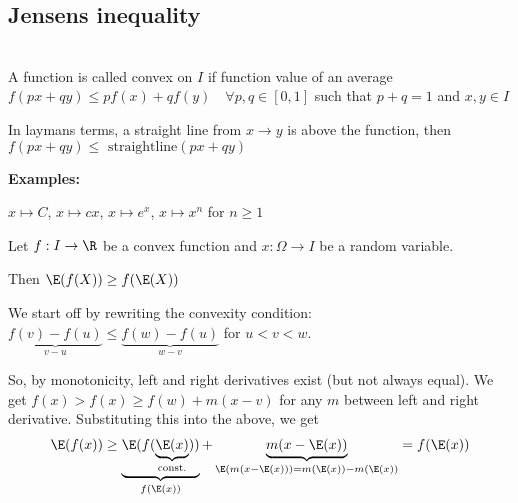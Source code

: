 \subsection{Jensens inequality}\hfill\\
\noindent A function is called convex on $I$ if function value of an average $f(px+qy)\leq pf(x)+qf(y)\quad\forall p,q\in[0,1]$ such that $p+q = 1$ and $x,y\in I$\par
\noindent In laymans terms, a straight line from $x\to y$ is above the function, then $f(px+qy)\leq\text{ straightline}(px+qy)$
\par\bigskip
\noindent\textbf{Examples:}\par
$x\mapsto C$, $x\mapsto cx$, $x\mapsto e^x$, $x\mapsto x^n$ for $n\geq 1$
\par\bigskip
\begin{defo}{}
  Let $f:I\to\R$ be a convex function and $x:\Omega\to I$ be a random variable.\par
  \noindent Then $\E(f(X))\geq f(\E(X))$
\end{defo}
\newpage
\begin{prf}{}
  We start off by rewriting the convexity condition: $\underbrace{f(v)-f(u)}_{v-u}\leq \underbrace{f(w)-f(u)}_{w-v}$ for $u<v<w$.\par
  \noindent So, by monotonicity, left and right derivatives exist (but not always equal). We get $f(x)>f(x)\geq f(w)+m(x-v)$ for any $m$ between left and right derivative. Substituting this into the above, we get
  \begin{equation*}
    \begin{gathered}
      \E(f(x))\geq \underbrace{\E(f(\underbrace{\E(x)}_{\text{const.}}))}_{f(\E(x))}+\underbrace{m(x-\E(x))}_{\E(m(x-\E(x)))=m(\E(x))-m(\E(x))}= f(\E(x))
    \end{gathered}
  \end{equation*}
\end{prf}
\par\bigskip
